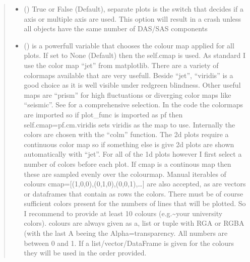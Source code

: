 \documentclass[letterpaper,10pt,english]{sphinxmanual}
\begin{document}
\begin{fulllineitems}
\begin{fulllineitems}
\begin{quote}
\begin{description}
\begin{itemize}
\item {} 
 (\sphinxstyleliteralemphasis{\sphinxupquote{, }}) \textendash{} True or False (Default), separate plots is the switch that decides if a axis or
multiple axis are used. This option will result in a crash unless all objects have the
same number of DAS/SAS components

\item {} 
 (\sphinxstyleliteralemphasis{\sphinxupquote{, }}) \textendash{} is a powerfull variable that chooses the colour map applied for all plots. If set to
None (Default) then the self.cmap is used.
As standard I use the color map “jet” from matplotlib. There are a variety of colormaps
available that are very usefull. Beside “jet”, “viridis” is a good choice as it is well
visible under red\sphinxhyphen{}green blindness. Other useful maps are “prism” for high fluctuations
or diverging color maps like “seismic”.
See  for a comprehensive
selection. In the code the colormaps are imported so if plot\_func is imported as pf then
self.cmap=pf.cm.viridis sets viridis as the map to use. Internally the colors are chosen
with the “colm” function. The 2d plots require a continuous color map so if something
else is give 2d plots are shown automatically with “jet”. For all of the 1d plots however
I first select a number of colors before each plot. If cmap is a continous map then these
are sampled evenly over the colourmap. Manual iterables of colours
cmap={[}(1,0,0),(0,1,0),(0,0,1),…{]} are also accepted, as are vectors or dataframes that
contain as rows the colors. There must be of course sufficient colors present for
the numbers of lines that will be plotted. So I recommend to provide at least 10 colours
(e.g.\textasciitilde{}your university colors). colours are always given as a, list or tuple with RGA or RGBA
(with the last A beeing the Alpha=transparency. All numbers are between 0 and 1.
If a list/vector/DataFrame is given for the colours they will be used in the order provided.

\end{itemize}


\end{description}
\end{quote}
\end{fulllineitems}
\end{fulllineitems}
\end{document}

